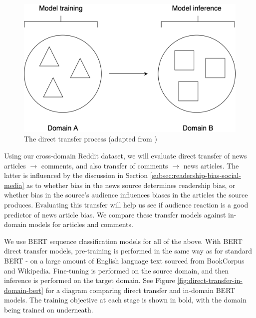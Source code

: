 \begin{figure}[ht]
    \centering
    \includegraphics[scale=0.25]{0-img/direct-transfer.png}
    \caption{The direct transfer process (adapted from \cite{ruder})}
    \label{fig:direct-transfer}
\end{figure}

Using our cross-domain Reddit dataset, we will evaluate direct transfer of news articles $ \rightarrow $ comments, and also transfer of comments $ \rightarrow $ news articles. The latter is influenced by the discussion in Section \ref{subsec:readership-bias-social-media} as to whether bias in the news source determines readership bias, or whether bias in the source's audience influences biases in the articles the source produces. Evaluating this transfer will help us see if audience reaction is a good predictor of news article bias. We compare these transfer models against in-domain models for articles and comments.

We use BERT sequence classification models for all of the above. With BERT direct transfer models, pre-training is performed in the same way as for standard BERT - on a large amount of English language text sourced from BookCorpus and Wikipedia. Fine-tuning is performed on the source domain, and then inference is performed on the target domain. See Figure \ref{fig:direct-transfer-in-domain-bert} for a diagram comparing direct transfer and in-domain BERT models. The training objective at each stage is shown in bold, with the domain being trained on underneath.

